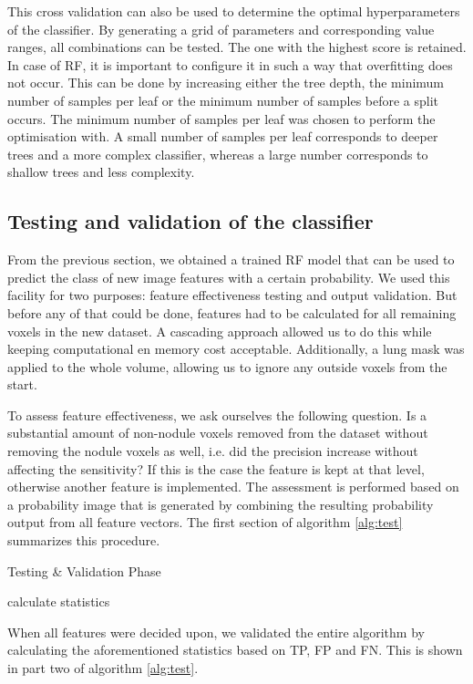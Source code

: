 This cross validation can also be used to determine the optimal hyperparameters
of the classifier. By generating a grid of parameters and corresponding value
ranges, all combinations can be tested. The one with the highest score is
retained. In case of RF, it is important to configure it in such a way that
overfitting does not occur. This can be done by increasing either the tree
depth, the minimum number of samples per leaf or the minimum number of samples
before a split occurs. The minimum number of samples per leaf was chosen to
perform the optimisation with. A small number of samples per leaf corresponds to
deeper trees and a more complex classifier, whereas a large number corresponds
to shallow trees and less complexity.

\subsection{Testing and validation of the classifier}
From the previous section, we obtained a trained RF model that can be used to
predict the class of new image features with a certain probability. We used this
facility for two purposes: feature effectiveness testing and output validation.
But before any of that could be done, features had to be calculated for all
remaining voxels in the new dataset. A cascading approach allowed us to do this
while keeping computational en memory cost acceptable. Additionally, a lung mask
was applied to the whole volume, allowing us to ignore any outside voxels from
the start.

To assess feature effectiveness, we ask ourselves the following question. Is a
substantial amount of non-nodule voxels removed from the dataset without
removing the nodule voxels as well, i.e. did the precision increase without
affecting the sensitivity? If this is the case the feature is kept at that
level, otherwise another feature is implemented. The assessment is performed
based on a probability image that is generated by combining the resulting
probability output from all feature vectors. The first section of algorithm
\ref{alg:test} summarizes this procedure.

\begin{algorithm}[ht]
	\DontPrintSemicolon
	\caption{Testing \& Validation Phase\label{alg:test}}
	calculate statistics
\end{algorithm}

When all features were decided upon, we validated the entire algorithm by 
calculating the aforementioned statistics based on TP, FP and FN. This is 
shown in part two of algorithm \ref{alg:test}.